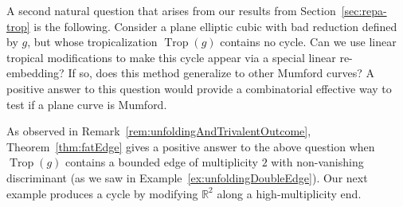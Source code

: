 \documentclass[11pt]{amsart}
\numberwithin{equation}{section}
\theoremstyle{plain}
\theoremstyle{definition}
\theoremstyle{remark}
\begin{document}
A second natural question that arises from our results from
Section~\ref{sec:repa-trop} is the following. Consider a plane
elliptic cubic with bad reduction defined by $g$, but whose
tropicalization $\operatorname{Trop}(g)$ contains no cycle. Can we use linear
tropical modifications to make this cycle appear via a special linear
re-embedding? If so, does this method generalize to other Mumford
curves? A positive answer to this question would provide a
combinatorial effective way to test if a plane curve is Mumford.

As observed in Remark~\ref{rem:unfoldingAndTrivalentOutcome},
Theorem~\ref{thm:fatEdge} gives a positive answer to the above
question when $\operatorname{Trop}(g)$ contains a bounded edge of multiplicity $2$
with non-vanishing discriminant (as we saw in
Example~\ref{ex:unfoldingDoubleEdge}). Our next example produces a
cycle by modifying ${\mathbb{R}}^2$ along a high-multiplicity
end. 
\end{document}
